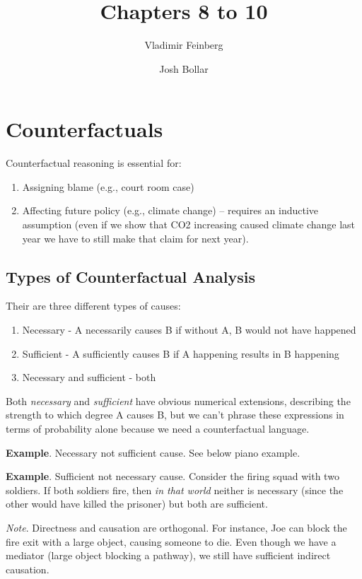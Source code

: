 \documentclass{article}
\title{Chapters 8 to 10}
\author{Vladimir Feinberg}
\author{Josh Bollar}
\begin{document}
\maketitle

\setcounter{section}{7}
\section{Counterfactuals}

Counterfactual reasoning is essential for:

\begin{enumerate}
\item Assigning blame (e.g., court room case)
\item Affecting future policy (e.g., climate change) -- requires an inductive assumption (even if we show that CO2 increasing caused climate change last year we have to still make that claim for next year).
\end{enumerate}

\subsection{Types of Counterfactual Analysis}

Their are three different types of causes:

\begin{enumerate}
\item Necessary - A necessarily causes B if without A, B would not have happened
\item Sufficient - A sufficiently causes B if A happening results in B happening
\item Necessary and sufficient - both
\end{enumerate}

Both \textit{necessary} and \textit{sufficient} have obvious numerical extensions, describing the strength to which degree A causes B, but we can't phrase these expressions in terms of probability alone because we need a counterfactual language.

\textbf{Example}. Necessary not sufficient cause. See below piano example.

\textbf{Example}. Sufficient not necessary cause. Consider the firing squad with two soldiers. If both soldiers fire, then \textit{in that world} neither is necessary (since the other would have killed the prisoner) but both are sufficient.

\textit{Note}. Directness and causation are orthogonal. For instance, Joe can block the fire exit with a large object, causing someone to die. Even though we have a mediator (large object blocking a pathway), we still have sufficient indirect causation.
\end{document}
